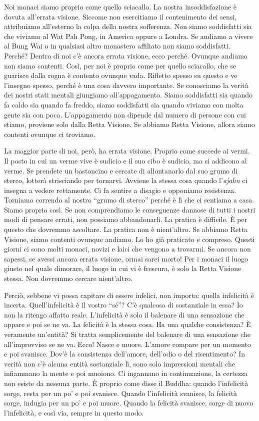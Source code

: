Noi monaci siamo proprio come quello sciacallo. La nostra
insoddisfazione è dovuta all'errata visione. Siccome non esercitiamo il
contenimento dei sensi, attribuiamo all'esterno la colpa della nostra
sofferenza. Non siamo soddisfatti sia che viviamo al Wat Pah Pong, in
America oppure a Londra. Se andiamo a vivere al Bung Wai o in qualsiasi
altro monastero affiliato non siamo soddisfatti. Perché? Dentro di noi
c'è ancora errata visione, ecco perché. Ovunque andiamo non siamo
contenti. Così, per noi è proprio come per quello sciacallo, che se
guarisce dalla rogna è contento ovunque vada. Rifletto spesso su questo
e ve l'insegno spesso, perché è una cosa davvero importante. Se
conosciamo la verità dei nostri stati mentali giungiamo
all'appagamento. Siamo soddisfatti sia quando fa caldo sia quando fa
freddo, siamo soddisfatti sia quando viviamo con molta gente sia con
poca. L'appagamento non dipende dal numero di persone con cui stiamo,
proviene solo dalla Retta Visione. Se abbiamo Retta Visione, allora
siamo contenti ovunque ci troviamo.

La maggior parte di noi, però, ha errata visione. Proprio come succede
ai vermi. Il posto in cui un verme vive è sudicio e il suo cibo è
sudicio, ma si addicono al verme. Se prendete un bastoncino e cercate di
allontanarlo dal suo grumo di sterco, lotterà strisciando per tornarvi.
Avviene la stessa cosa quando l'\emph{ajahn} ci insegna a vedere
rettamente. Ci fa sentire a disagio e opponiamo resistenza. Torniamo
correndo al nostro ``grumo di sterco'' perché è lì che ci sentiamo a
casa. Siamo proprio così. Se non comprendiamo le conseguenze dannose di
tutti i nostri modi di pensare errati, non possiamo abbandonarli. La
pratica è difficile. È per questo che dovremmo ascoltare. La pratica non
è nient'altro. Se abbiamo Retta Visione, siamo contenti ovunque andiamo.
Lo ho già praticato e compreso. Questi giorni ci sono molti monaci,
novizi e laici che vengono a trovarmi. Se ancora non sapessi, se avessi
ancora errata visione, ormai sarei morto! Per i monaci il luogo giusto
nel quale dimorare, il luogo in cui vi è frescura, è solo la Retta
Visione stessa. Non dovremmo cercare nient'altro.

Perciò, sebbene vi possa capitare di essere infelici, non importa:
quella infelicità è incerta. Quell'infelicità è il vostro ``sé''? C'è
qualcosa di sostanziale in essa? Io non la ritengo affatto reale.
L'infelicità è solo il balenare di una sensazione che appare e poi se ne
va. La felicità è la stessa cosa. Ha una qualche consistenza? È
veramente un'entità? Si tratta semplicemente del balenare di una
sensazione che all'improvviso se ne va. Ecco! Nasce e muore. L'amore
compare per un momento e poi svanisce. Dov'è la consistenza dell'amore,
dell'odio o del risentimento? In verità non c'è alcuna entità
sostanziale lì, sono solo impressioni mentali che infiammano la mente e
poi muoiono. Ci ingannano in continuazione, la certezza non esiste da
nessuna parte. È proprio come disse il Buddha: quando l'infelicità
sorge, resta per un po' e poi svanisce. Quando l'infelicità svanisce, la
felicità sorge, indugia per un po' e poi muore. Quando la felicità
svanisce, sorge di nuovo l'infelicità, e così via, sempre in questo
modo.

